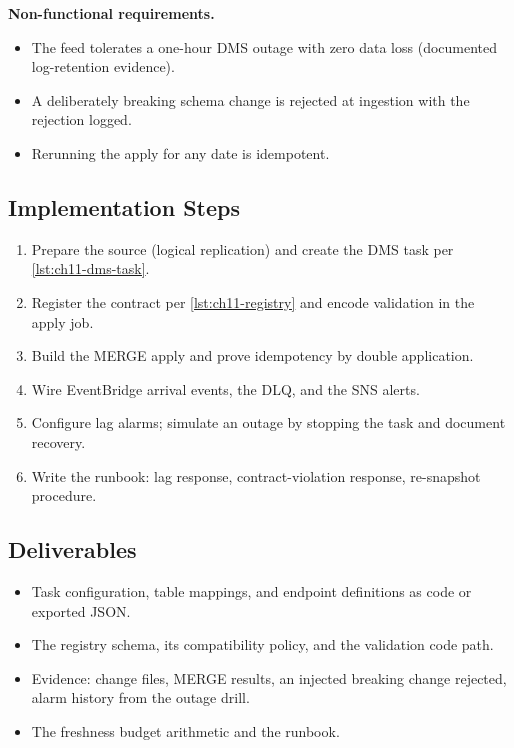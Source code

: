\textbf{Non-functional requirements.}
\begin{itemize}
    \item The feed tolerates a one-hour DMS outage with zero data loss (documented log-retention evidence).
    \item A deliberately breaking schema change is rejected at ingestion with the rejection logged.
    \item Rerunning the apply for any date is idempotent.
\end{itemize}

\subsection*{Implementation Steps}
\begin{enumerate}
    \item Prepare the source (logical replication) and create the DMS task per \cref{lst:ch11-dms-task}.
    \item Register the contract per \cref{lst:ch11-registry} and encode validation in the apply job.
    \item Build the MERGE apply and prove idempotency by double application.
    \item Wire EventBridge arrival events, the DLQ, and the SNS alerts.
    \item Configure lag alarms; simulate an outage by stopping the task and document recovery.
    \item Write the runbook: lag response, contract-violation response, re-snapshot procedure.
\end{enumerate}

\subsection*{Deliverables}
\begin{itemize}
    \item Task configuration, table mappings, and endpoint definitions as code or exported JSON.
    \item The registry schema, its compatibility policy, and the validation code path.
    \item Evidence: change files, MERGE results, an injected breaking change rejected, alarm history from the outage drill.
    \item The freshness budget arithmetic and the runbook.
\end{itemize}


